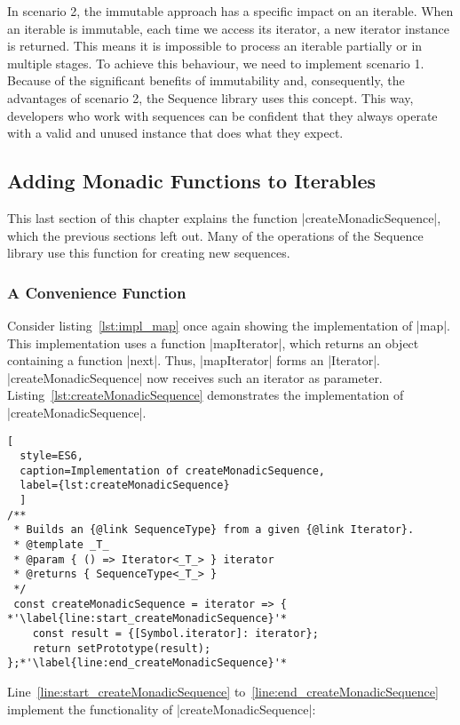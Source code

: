 In scenario 2, the immutable approach has a specific impact on an iterable.
When an iterable is immutable, each time we access its iterator, a new iterator
instance is returned. 
This means it is impossible to process an iterable partially or in multiple stages.
To achieve this behaviour, we need to implement scenario 1.
\\
Because of the significant benefits of immutability and, consequently, the
advantages of scenario 2, the Sequence library uses this concept. This way,
developers who work with sequences can be confident that they always operate
with a valid and unused instance that does what they expect.

\subsection{Adding Monadic Functions to Iterables}
\label{sub:Adding Monadic Functions to Iterables}
This last section of this chapter explains the function
|createMonadicSequence|, which the previous sections left out. Many of the
operations of the Sequence library use this function for creating new
sequences.

\subsubsection{A Convenience Function}
\label{subsub:A Convenience Function}
Consider listing~\ref{lst:impl_map} once again showing the implementation of
|map|. This implementation uses a function |mapIterator|, which returns an
object containing a function |next|. Thus, |mapIterator| forms an |Iterator|.
|createMonadicSequence| now receives such an iterator as parameter.
Listing~\ref{lst:createMonadicSequence} demonstrates the implementation of
|createMonadicSequence|.

\begin{lstlisting}[
  style=ES6, 
  caption=Implementation of createMonadicSequence,
  label={lst:createMonadicSequence}
  ]
/**
 * Builds an {@link SequenceType} from a given {@link Iterator}.
 * @template _T_
 * @param { () => Iterator<_T_> } iterator
 * @returns { SequenceType<_T_> }
 */
 const createMonadicSequence = iterator => { *'\label{line:start_createMonadicSequence}'*
    const result = {[Symbol.iterator]: iterator};
    return setPrototype(result);
};*'\label{line:end_createMonadicSequence}'*
\end{lstlisting}

Line~\ref{line:start_createMonadicSequence}
to~\ref{line:end_createMonadicSequence} implement the functionality of
|createMonadicSequence|:

